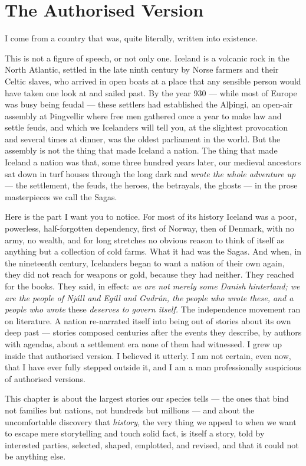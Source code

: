 \chapter{The Authorised Version}

I come from a country that was, quite literally, written into existence.

This is not a figure of speech, or not only one. Iceland is a volcanic rock in the North Atlantic, settled in the late ninth century by Norse farmers and their Celtic slaves, who arrived in open boats at a place that any sensible person would have taken one look at and sailed past. By the year 930 — while most of Europe was busy being feudal — these settlers had established the Alþingi, an open-air assembly at Þingvellir where free men gathered once a year to make law and settle feuds, and which we Icelanders will tell you, at the slightest provocation and several times at dinner, was the oldest parliament in the world. But the assembly is not the thing that made Iceland a nation. The thing that made Iceland a nation was that, some three hundred years later, our medieval ancestors sat down in turf houses through the long dark and \emph{wrote the whole adventure up} — the settlement, the feuds, the heroes, the betrayals, the ghosts — in the prose masterpieces we call the Sagas.

Here is the part I want you to notice. For most of its history Iceland was a poor, powerless, half-forgotten dependency, first of Norway, then of Denmark, with no army, no wealth, and for long stretches no obvious reason to think of itself as anything but a collection of cold farms. What it had was the Sagas. And when, in the nineteenth century, Icelanders began to want a nation of their own again, they did not reach for weapons or gold, because they had neither. They reached for the books. They said, in effect: \emph{we are not merely some Danish hinterland; we are the people of Njáll and Egill and Gudrún, the people who wrote these, and a people who wrote} these \emph{deserves to govern itself.} The independence movement ran on literature. A nation re-narrated itself into being out of stories about its own deep past — stories composed centuries after the events they describe, by authors with agendas, about a settlement era none of them had witnessed. I grew up inside that authorised version. I believed it utterly. I am not certain, even now, that I have ever fully stepped outside it, and I am a man professionally suspicious of authorised versions.

This chapter is about the largest stories our species tells — the ones that bind not families but nations, not hundreds but millions — and about the uncomfortable discovery that \emph{history,} the very thing we appeal to when we want to escape mere storytelling and touch solid fact, is itself a story, told by interested parties, selected, shaped, emplotted, and revised, and that it could not be anything else.


